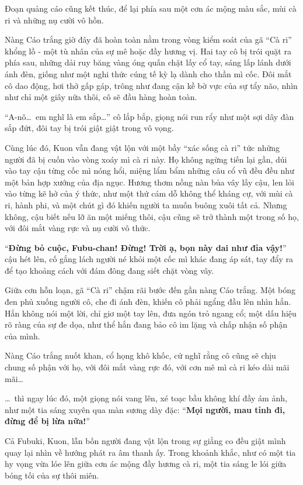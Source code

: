 \documentclass[../main.tex]{subfiles}
\begin{document}
Đoạn quảng cáo cũng kết thúc, để lại phía sau một cơn ác mộng màu sắc, mùi cà ri và những nụ cười vô hồn.

\il

Nàng Cáo trắng giờ đây đã hoàn toàn nằm trong vòng kiểm soát của gã ``Cà ri'' khổng lồ - một tù nhân của sự mê hoặc đầy hương vị. Hai tay cô bị trói quặt ra phía sau, những dải ruy băng vàng óng quấn chặt lấy cổ tay, sáng lấp lánh dưới ánh đèn, giống như một nghi thức cúng tế kỳ lạ dành cho thần mì cốc. Đôi mắt cô dao động, hơi thở gấp gáp, trông như đang cận kề bờ vực của sự tẩy não, nhìn như chỉ một giây nữa thôi, cô sẽ đầu hàng hoàn toàn.


``A-nô\dots\ em nghĩ là em sắp\dots'' cô lắp bắp, giọng nói run rẩy như một sợi dây đàn sắp đứt, đôi tay bị trói giật giật trong vô vọng.

Cùng lúc đó, Kuon vẫn đang vật lộn với một bầy ``xác sống cà ri'' tức những người đã bị cuốn vào vòng xoáy mì cà ri này. Họ không ngừng tiến lại gần, dúi vào tay cậu từng cốc mì nóng hổi, miệng lẩm bẩm những câu cổ vũ đều đều như một bản hợp xướng của địa ngục. Hương thơm nồng nàn bủa vây lấy cậu, len lỏi vào từng kẽ hở của ý thức, như một thứ cám dỗ không thể kháng cự, với mùi cà ri, hành phi, và một chút gì đó khiến người ta muốn buông xuôi tất cả. Nhưng không, cậu biết nếu lỡ ăn một miếng thôi, cậu cũng sẽ trở thành một trong số họ, với đôi mắt vàng rực và nụ cười vô thức.

``\textbf{Đừng bỏ cuộc, Fubu-chan! Đừng! Trời ạ, bọn này dai như đỉa vậy!}'' cậu hét lên, cố gắng lách người né khỏi một cốc mì khác đang áp sát, tay đẩy ra để tạo khoảng cách với đám đông đang siết chặt vòng vây.

Giữa cơn hỗn loạn, gã ``Cà ri'' chậm rãi bước đến gần nàng Cáo trắng. Một bóng đen phủ xuống người cô, che đi ánh đèn, khiến cô phải ngẩng đầu lên nhìn hắn. Hắn không nói một lời, chỉ giơ một tay lên, đưa ngón trỏ ngang cổ; một dấu hiệu rõ ràng của sự đe dọa, như thể hắn đang bảo cô im lặng và chấp nhận số phận của mình.

Nàng Cáo trắng nuốt khan, cổ họng khô khốc, cứ nghĩ rằng cô cũng sẽ chịu chung số phận với họ, với đôi mắt vàng rực đó, với cơn mê mì cà ri kéo dài mãi mãi\dots

\dots\ thì ngay lúc đó, một giọng nói vang lên, xé toạc bầu không khí đầy ám ảnh, như một tia sáng xuyên qua màn sương dày đặc: ``\textbf{Mọi người, mau tỉnh đi, đừng để bị lừa nữa!}''

Cả Fubuki, Kuon, lẫn bốn người đang vật lộn trong sự giằng co đều giật mình quay lại nhìn về hướng phát ra âm thanh ấy. Trong khoảnh khắc, như có một tia hy vọng vừa lóe lên giữa cơn ác mộng đầy hương cà ri, một tia sáng le lói giữa bóng tối của sự thôi miên.
\end{document}
